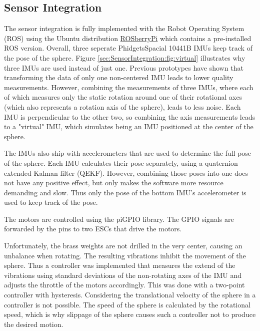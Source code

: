 \subsection{Sensor Integration}
\label{sec:TechnicalApproach:sensorintegration}

The sensor integration is fully implemented with the Robot Operating System (ROS) using the Ubuntu distribution \href{http://wiki.ros.org/ROSberryPi}{ROSberryPi} which contains a pre-installed ROS version.
Overall, three seperate PhidgetsSpacial 10441B IMUs \cite{imuphidgets} keep track of the pose of the sphere.
Figure \ref{sec:SensorIntegration:fig:virtual} illustrates why three IMUs are used instead of just one.
Previous prototypes have shown that transforming the data of only one non-centered IMU leads to lower quality measurements. 
However, combining the measurements of three IMUs, where each of which measures only the static rotation around one of their rotational axes (which also represents a rotation axis of the sphere), leads to less noise.
Each IMU is perpendicular to the other two, so combining the axis measurements leads to a "virtual" IMU, which simulates being an IMU positioned at the center of the sphere. 

The IMUs also ship with accelerometers that are used to determine the full pose of the sphere.
Each IMU calculates their pose separately, using a quaternion extended Kalman filter (QEKF).
However, combining those poses into one does not have any positive effect, but only makes the software more resource demanding and slow.
Thus only the pose of the bottom IMU's accelerometer is used to keep track of the pose.

The motors are controlled using the piGPIO library. The GPIO signals are forwarded by the pins to two ESCs that drive the motors. 

Unfortunately, the brass weights are not drilled in the very center, causing an unbalance when rotating.
The resulting vibrations inhibit the movement of the sphere.
Thus a controller was implemented that measures the extend of the vibrations using standard deviations of the non-rotating axes of the IMU and adjusts the throttle of the motors accordingly.
This was done with a two-point controller with hysteresis.
Considering the translational velocity of the sphere in a controller is not possible.
The speed of the sphere is calculated by the rotational speed, which is why slippage of the sphere causes such a controller not to produce the desired motion. 

